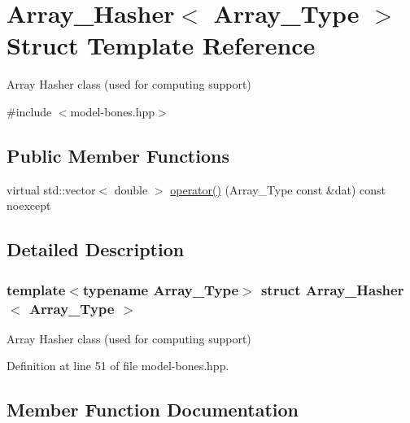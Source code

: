 \hypertarget{struct_array___hasher}{}\section{Array\+\_\+\+Hasher$<$ Array\+\_\+\+Type $>$ Struct Template Reference}
\label{struct_array___hasher}


Array Hasher class (used for computing support)  




{\ttfamily \#include $<$model-\/bones.\+hpp$>$}

\subsection*{Public Member Functions}
\begin{DoxyCompactItemize}
\item 
virtual std\+::vector$<$ double $>$ \hyperlink{struct_array___hasher_a096dc8674477127f45a54ff4dc4038b0}{operator()} (Array\+\_\+\+Type const \&dat) const noexcept
\end{DoxyCompactItemize}


\subsection{Detailed Description}
\subsubsection*{template$<$typename Array\+\_\+\+Type$>$\newline
struct Array\+\_\+\+Hasher$<$ Array\+\_\+\+Type $>$}

Array Hasher class (used for computing support) 



Definition at line 51 of file model-\/bones.\+hpp.



\subsection{Member Function Documentation}
\mbox{\label{struct_array___hasher_a096dc8674477127f45a54ff4dc4038b0}} 

